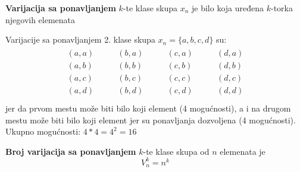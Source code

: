 \begin{definition}
	\textbf{Varijacija sa ponavljanjem} $k$-te klase skupa $x_n$ je bilo koja uređena $k$-torka njegovih elemenata
\end{definition}
\begin{example}
	Varijacije sa ponavljanjem 2. klase skupa $x_n = \{a,b,c,d\}$ su:
	\begin{align*}
		\begin{aligned}
			(a,a)\\
			(a,b)\\
			(a,c)\\
			(a,d)\\
		\end{aligned}
		\quad \quad
		\begin{aligned}
			(b,a)\\
			(b,b)\\
			(b,c)\\
			(b,d)\\
		\end{aligned}
		\quad \quad
		\begin{aligned}
			(c,a)\\
			(c,b)\\
			(c,c)\\
			(c,d)\\
		\end{aligned}
		\quad \quad
		\begin{aligned}
			(d,a)\\
			(d,b)\\
			(d,c)\\
			(d,d)\\
		\end{aligned}
	\end{align*}
	jer da prvom mestu može biti bilo koji element (4 mogućnosti), a i na drugom mestu može biti bilo koji element jer su ponavljanja dozvoljena (4 mogućnosti).\\
	Ukupno mogućnosti: $4*4 = 4^2 = 16$
\end{example}
\begin{theorem}
	\textbf{Broj varijacija sa ponavljanjem} $k$-te klase skupa od $n$ elemenata je $$V_n^k = n^k$$
\end{theorem}

